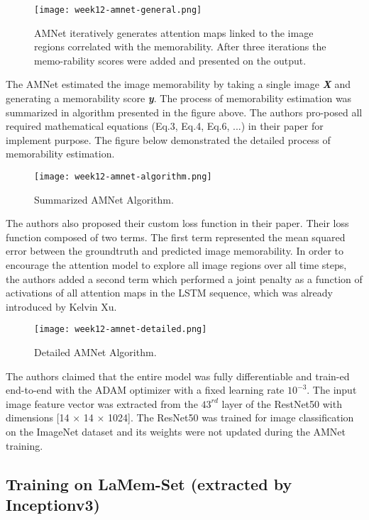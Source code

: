 \begin{figure}[!ht]
\centering
\texttt{[image: week12-amnet-general.png]}
\caption{AMNet iteratively generates attention maps linked to the image regions correlated with the memorability. After three iterations the memo-rability scores were added and presented on the output.}
\end{figure}

The AMNet estimated the image memorability by taking a single image \textbf{\emph{X}} and generating a memorability score \textbf{\emph{y}}. The process of memorability estimation was summarized in algorithm presented in the figure above. The authors pro-posed all required mathematical equations (Eq.3, Eq.4, Eq.6, ...) in their paper for implement purpose. The figure below demonstrated the detailed process of memorability estimation.

\newpage
\begin{figure}[!ht]
\centering
\texttt{[image: week12-amnet-algorithm.png]}
\caption{Summarized AMNet Algorithm.}
\end{figure}

The authors also proposed their custom loss function in their paper. Their loss function composed of two terms. The first term represented the mean squared error between the groundtruth and predicted image memorability. In order to encourage the attention model to explore all image regions over all time steps, the authors added a second term which performed a joint penalty as a function of activations of all attention maps in the LSTM sequence, which was already introduced by Kelvin Xu\cite{visualatt}.

\begin{figure}[!ht]
\centering
\texttt{[image: week12-amnet-detailed.png]}
\caption{Detailed AMNet Algorithm.}
\end{figure}

The authors claimed that the entire model was fully differentiable and train-ed end-to-end with the ADAM\cite{adam} optimizer with a fixed learning rate $10^{−3}$. The input image feature vector was extracted from the $43^{rd}$ layer of the RestNet50 with dimensions [14 $\times$ 14 $\times$ 1024]. The ResNet50 was trained for image classification on the ImageNet dataset and its weights were not updated during the AMNet training.

\subsection{Training on LaMem-Set (extracted by Inceptionv3)}
